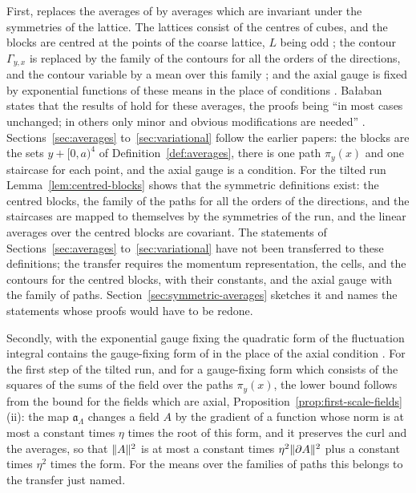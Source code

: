 \documentclass[11pt]{preprint}
\DeclarePairedDelimiter{\norm}{\lVert}{\rVert}
\numberwithin{equation}{section}
\theoremstyle{definition}
\theoremstyle{remark}
\theoremstyle{plain}
\begin{document}
First, \cite{BalabanRG1} replaces the averages of \cite{BalabanAVG} by averages which are invariant under the symmetries of the lattice. The lattices consist of the centres of cubes, and the blocks are centred at the points of the coarse lattice, $L$ being odd \cite[(0.1), (0.3)]{BalabanRG1}; the contour $\Gamma_{y,x}$ is replaced by the family of the contours for all the orders of the directions, and the contour variable by a mean over this family \cite[(0.4), (0.11), (0.12)]{BalabanRG1}; and the axial gauge is fixed by exponential functions of these means in the place of conditions \cite[(0.14)--(0.16)]{BalabanRG1}. Ba{\l}aban states that the results of \cite{BalabanAVG} hold for these averages, the proofs being ``in most cases unchanged; in others only minor and obvious modifications are needed'' \cite[p.~254]{BalabanRG1}. Sections~\ref{sec:averages} to~\ref{sec:variational} follow the earlier papers: the blocks are the sets $y + [0, a)^4$ of Definition~\ref{def:averages}, there is one path $\pi_y(x)$ and one staircase for each point, and the axial gauge is a condition. For the tilted run Lemma~\ref{lem:centred-blocks} shows that the symmetric definitions exist: the centred blocks, the family of the paths for all the orders of the directions, and the staircases are mapped to themselves by the symmetries of the run, and the linear averages over the centred blocks are covariant. The statements of Sections~\ref{sec:averages} to~\ref{sec:variational} have not been transferred to these definitions; the transfer requires the momentum representation, the cells, and the contours for the centred blocks, with their constants, and the axial gauge with the family of paths. Section~\ref{sec:symmetric-averages} sketches it and names the statements whose proofs would have to be redone.

Secondly, with the exponential gauge fixing the quadratic form of the fluctuation integral contains the gauge-fixing form of \cite[(2.5)]{BalabanRG1} in the place of the axial condition \cite[(2.11), p.~267]{BalabanRG1}. For the first step of the tilted run, and for a gauge-fixing form which consists of the squares of the sums of the field over the paths $\pi_y(x)$, the lower bound follows from the bound for the fields which are axial, Proposition~\ref{prop:first-scale-fields}(ii): the map $\mathfrak a_\Lambda$ changes a field $A$ by the gradient of a function whose norm is at most a constant times $\eta$ times the root of this form, and it preserves the curl and the averages, so that $\norm A^2$ is at most a constant times $\eta^2\norm{\partial A}^2$ plus a constant times $\eta^2$ times the form. For the means over the families of paths this belongs to the transfer just named.
\end{document}
